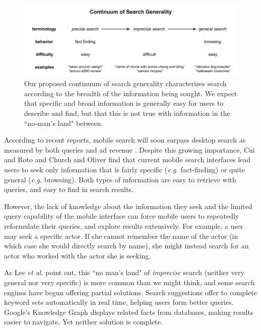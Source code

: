 \begin{figure}[ht]
\centering
\includegraphics[width=\textwidth]{images/terminologydiagram}
\caption{ Our proposed continuum of search generality characterizes search according to the breadth of the information being sought. We expect that specific and broad information is generally easy for users to describe and find, but that this is not true with information in the ``no-man's land" between.}
\label{fig:searchcontinuum}
\end{figure}




According to recent reports, mobile search will soon surpass desktop search as measured by both queries and ad revenue \cite{MobileQueries}\cite{MobileRevenue}. Despite this growing importance, Cui and Roto \cite{Cui:2008} and Church and Oliver \cite{Church:2011} find that current mobile search interfaces lead users to seek only information that is fairly specific (\textit{e.g.} fact-finding) or quite general (\textit{e.g.} browsing). Both types of information are easy to retrieve with queries, and easy to find in search results.

However, the lack of knowledge about the information they seek and the limited query capability of the mobile interface \cite{Kamvar:2009} can force mobile users to repeatedly reformulate their queries, and explore results extensively. For example, a user may seek a specific actor. If she cannot remember the name of the actor (in which case she would directly search by name), she might instead search for an actor who worked with the actor she is seeking. 

As Lee \textit{et al.} \cite{Lee:2012} point out, this ``no man's land" of \textit{imprecise} search (neither very general nor very specific) is more common than we might think, and some search engines have begun offering partial solutions. Search suggestions offer to complete keyword sets automatically in real time, helping users form better queries. Google's Knowledge Graph \cite{GoogleKnowledgeGraph} displays related facts from databases, making results easier to navigate. Yet neither solution is complete.

